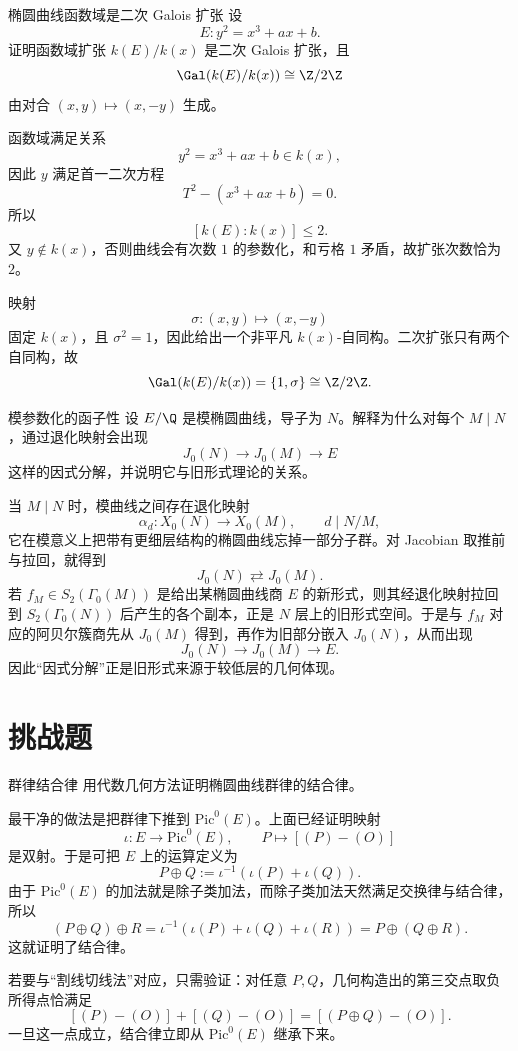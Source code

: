 \begin{problem}{椭圆曲线函数域是二次 Galois 扩张 \medium}
设
\[
E: y^2=x^3+ax+b.
\]
证明函数域扩张 $k(E)/k(x)$ 是二次 Galois 扩张，且
\[
\Gal(k(E)/k(x))\cong \Z/2\Z
\]
由对合 $(x,y)\mapsto(x,-y)$ 生成。
\end{problem}
\begin{solution}
函数域满足关系
\[
y^2=x^3+ax+b\in k(x),
\]
因此 $y$ 满足首一二次方程
\[
T^2-(x^3+ax+b)=0.
\]
所以
\[
[k(E):k(x)]\le 2.
\]
又 $y\notin k(x)$，否则曲线会有次数 $1$ 的参数化，和亏格 $1$ 矛盾，故扩张次数恰为 $2$。

映射
\[
\sigma:(x,y)\longmapsto(x,-y)
\]
固定 $k(x)$，且 $\sigma^2=1$，因此给出一个非平凡 $k(x)$-自同构。二次扩张只有两个自同构，故
\[
\Gal(k(E)/k(x))=\{1,\sigma\}\cong\Z/2\Z.
\]
\end{solution}

\begin{problem}{模参数化的函子性 \medium}
设 $E/\Q$ 是模椭圆曲线，导子为 $N$。解释为什么对每个 $M\mid N$，通过退化映射会出现
\[
J_0(N)\longrightarrow J_0(M)\longrightarrow E
\]
这样的因式分解，并说明它与旧形式理论的关系。
\end{problem}
\begin{solution}
当 $M\mid N$ 时，模曲线之间存在退化映射
\[
\alpha_d:X_0(N)\to X_0(M),\qquad d\mid N/M,
\]
它在模意义上把带有更细层结构的椭圆曲线忘掉一部分子群。对 Jacobian 取推前与拉回，就得到
\[
J_0(N)\rightleftarrows J_0(M).
\]
若 $f_M\in S_2(\Gamma_0(M))$ 是给出某椭圆曲线商 $E$ 的新形式，则其经退化映射拉回到 $S_2(\Gamma_0(N))$ 后产生的各个副本，正是 $N$ 层上的旧形式空间。于是与 $f_M$ 对应的阿贝尔簇商先从 $J_0(M)$ 得到，再作为旧部分嵌入 $J_0(N)$，从而出现
\[
J_0(N)\to J_0(M)\to E.
\]
因此“因式分解”正是旧形式来源于较低层的几何体现。
\end{solution}

\section*{挑战题}

\begin{problem}{群律结合律 \hard}
用代数几何方法证明椭圆曲线群律的结合律。
\end{problem}
\begin{solution}
最干净的做法是把群律下推到 $\mathrm{Pic}^0(E)$。上面已经证明映射
\[
\iota:E\to\mathrm{Pic}^0(E),\qquad P\mapsto[(P)-(O)]
\]
是双射。于是可把 $E$ 上的运算定义为
\[
P\oplus Q:=\iota^{-1}(\iota(P)+\iota(Q)).
\]
由于 $\mathrm{Pic}^0(E)$ 的加法就是除子类加法，而除子类加法天然满足交换律与结合律，所以
\[
(P\oplus Q)\oplus R
=\iota^{-1}(\iota(P)+\iota(Q)+\iota(R))
=P\oplus(Q\oplus R).
\]
这就证明了结合律。

若要与“割线切线法”对应，只需验证：对任意 $P,Q$，几何构造出的第三交点取负所得点恰满足
\[
[(P)-(O)]+[(Q)-(O)]=[(P\oplus Q)-(O)].
\]
一旦这一点成立，结合律立即从 $\mathrm{Pic}^0(E)$ 继承下来。
\end{solution}

